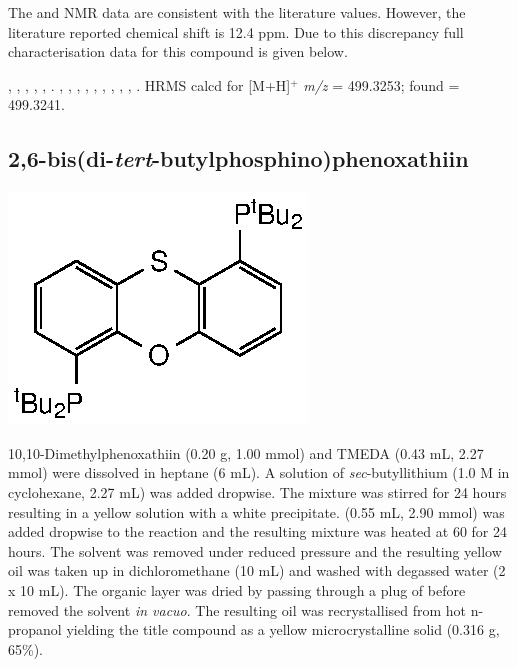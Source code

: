 The \proton{} and \carbon{} NMR data are consistent with the literature values.\cite{Mispelaere2005}  However, the literature reported \phosphorus{} chemical shift is 12.4 ppm.  Due to this discrepancy full characterisation data for this compound is given below.

,
,
,
,
,
.
,
,
,
,
,
,
,
,
,
.
HRMS calcd for  [M+H]$^+$ \emph{m/z} = 499.3253; found = 499.3241.


\subsection*{2,6-bis(di-\emph{tert}-butylphosphino)phenoxathiin}

\begin{structure}[h]
\begin{center}
\includegraphics{../Structures/Transthixantphos.eps}
\end{center}
\end{structure}

10,10-Dimethylphenoxathiin (0.20 g, 1.00 mmol) and TMEDA (0.43 mL, 2.27 mmol) were dissolved in heptane (6 mL).  A solution of \emph{sec}-butyllithium (1.0 M in cyclohexane, 2.27 mL) was added dropwise.  The mixture was stirred for 24 hours resulting in a yellow solution with a white precipitate.   (0.55 mL, 2.90 mmol) was added dropwise to the reaction and the resulting mixture was heated at 60 \degC{}  for 24 hours.  The solvent was removed under reduced pressure and the resulting yellow oil was taken up in dichloromethane (10 mL) and washed with degassed water (2 x 10 mL).  The organic layer was dried by passing through a plug of  before removed the solvent \emph{in vacuo}.  The resulting oil was recrystallised from hot n-propanol yielding the title compound as a yellow microcrystalline solid (0.316 g, 65\%).  

